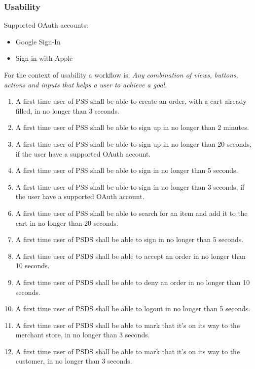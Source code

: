 \subsubsection{Usability}
Supported OAuth accounts: 
\begin{itemize}
    \item Google Sign-In
    \item Sign in with Apple
\end{itemize}
 
\noindent For the context of usability a workflow is: \textit{Any combination 
of views, buttons, actions and inputs that helps a user to achieve a goal}.

\begin{enumerate}[label=USE-\arabic*]
    \item A first time user of PSS shall be able to create an order, with a 
    cart already filled, in no longer than 3 seconds.
    \item A first time user of PSS shall be able to sign up in no longer 
    than 2 minutes.
    \item A first time user of PSS shall be able to sign up in no longer 
    than 20 seconds, if the user have a supported OAuth account.
    \item A first time user of PSS shall be able to sign in no longer 
    than 5 seconds.
    \item A first time user of PSS shall be able to sign in no longer 
    than 3 seconds, if the user have a supported OAuth account.
    \item A first time user of PSS shall be able to search for an item and 
    add it to the cart in no longer than 20 seconds.
    \item A first time user of PSDS shall be able to sign in no longer 
    than 5 seconds.
    \item A first time user of PSDS shall be able to accept an order in no 
    longer than 10 seconds.
    \item A first time user of PSDS shall be able to deny an order in no 
    longer than 10 seconds.
    \item A first time user of PSDS shall be able to logout in no longer 
    than 5 seconds.
    \item A first time user of PSDS shall be able to mark that it’s on its 
    way to the merchant store, in no longer than 3 seconds.
    \item A first time user of PSDS shall be able to mark that it’s on its 
    way to the customer, in no longer than 3 seconds.

\end{enumerate}
